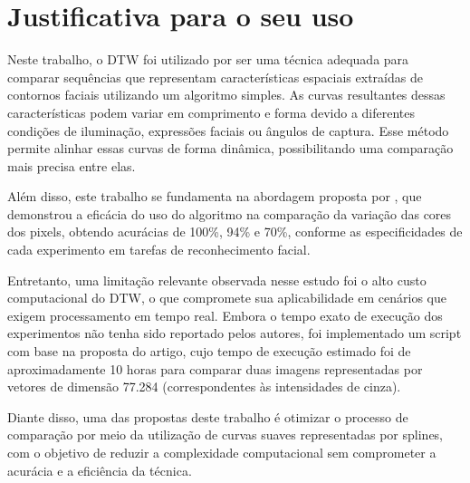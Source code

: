 \section{Justificativa para o seu uso}

Neste trabalho, o DTW foi utilizado por ser uma técnica adequada para comparar sequências que representam características espaciais extraídas de contornos faciais utilizando um algoritmo simples. As curvas resultantes dessas características podem variar em comprimento e forma devido a diferentes condições de iluminação, expressões faciais ou ângulos de captura. Esse método permite alinhar essas curvas de forma dinâmica, possibilitando uma comparação mais precisa entre elas.

Além disso, este trabalho se fundamenta na abordagem proposta por \citet{DTW_LSTM}, que demonstrou a eficácia do uso do algoritmo na comparação da variação das cores dos pixels, obtendo acurácias de 100\%, 94\% e 70\%, conforme as especificidades de cada experimento em tarefas de reconhecimento facial. %

Entretanto, uma limitação relevante observada nesse estudo foi o alto custo computacional do DTW, o que compromete sua aplicabilidade em cenários que exigem processamento em tempo real. Embora o tempo exato de execução dos experimentos não tenha sido reportado pelos autores, foi implementado um script com base na proposta do artigo, cujo tempo de execução estimado foi de aproximadamente 10 horas para comparar duas imagens representadas por vetores de dimensão 77.284 (correspondentes às intensidades de cinza).

Diante disso, uma das propostas deste trabalho é otimizar o processo de comparação por meio da utilização de curvas suaves representadas por splines, com o objetivo de reduzir a complexidade computacional sem comprometer a acurácia e a eficiência da técnica.

